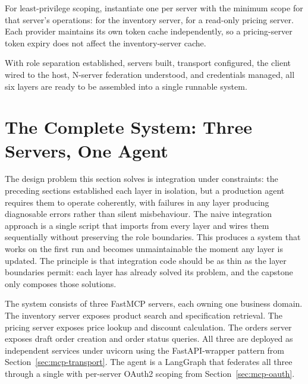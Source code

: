 \begin{tipbox}
For least-privilege scoping, instantiate one 
per server with the minimum scope for that server's operations:
 for the inventory server,
 for a read-only pricing server.
Each provider maintains its own token cache independently, so a
pricing-server token expiry does not affect the inventory-server cache.
\end{tipbox}

With role separation established, servers built, transport configured,
the client wired to the host, N-server federation understood, and
credentials managed, all six layers are ready to be assembled into
a single runnable system.

\section{The Complete System: Three Servers, One Agent}
\label{sec:mcp-capstone}

The design problem this section solves is integration under constraints:
the preceding sections established each layer in isolation, but a
production agent requires them to operate coherently, with failures in
any layer producing diagnosable errors rather than silent misbehaviour.
The naive integration approach is a single script that imports from
every layer and wires them sequentially without preserving the role
boundaries. This produces a system that works on the first run and
becomes unmaintainable the moment any layer is updated. The principle
is that integration code should be as thin as the layer boundaries
permit: each layer has already solved its problem, and the capstone
only composes those solutions.

The system consists of three FastMCP servers, each owning one business
domain. The inventory server exposes product search and specification
retrieval. The pricing server exposes price lookup and discount
calculation. The orders server exposes draft order creation and order
status queries. All three are deployed as independent services under
uvicorn using the FastAPI-wrapper pattern from
Section~\ref{sec:mcp-transport}. The agent is a LangGraph
 that federates all three through a single
 with per-server OAuth2 scoping from
Section~\ref{sec:mcp-oauth}.

